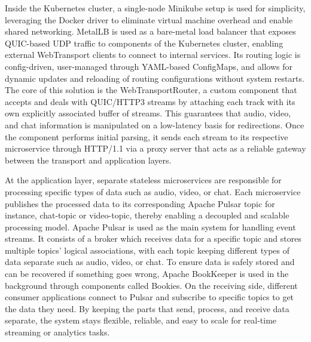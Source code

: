 Inside the Kubernetes cluster, a single-node Minikube setup is used for simplicity, leveraging the Docker driver to eliminate virtual machine overhead and enable shared networking. MetalLB is used as a bare-metal load balancer that exposes QUIC-based UDP traffic to components of the Kubernetes cluster, enabling external WebTransport clients to connect to internal services. Its routing logic is config-driven, user-managed through YAML-based ConfigMaps, and allows for dynamic updates and reloading of routing configurations without system restarts. The core of this solution is the WebTransportRouter, a custom component that accepts and deals with QUIC/HTTP3 streams by attaching each track with its own explicitly associated buffer of streams. This guarantees that audio, video, and chat information is manipulated on a low-latency basis for redirections. Once the component performs initial parsing, it sends each stream to its respective microservice through HTTP/1.1 via a proxy server that acts as a reliable gateway between the transport and application layers.

At the application layer, separate stateless microservices are responsible for processing specific types of data such as audio, video, or chat. Each microservice publishes the processed data to its corresponding Apache Pulsar topic for instance, chat-topic or video-topic, thereby enabling a decoupled and scalable processing model. Apache Pulsar is used as the main system for handling event streams. It consists of a broker which receives data for a specific topic and stores multiple topics' logical associations, with each topic keeping different types of data separate such as audio, video, or chat. To ensure data is safely stored and can be recovered if something goes wrong, Apache BookKeeper is used in the background through components called Bookies. On the receiving side, different consumer applications connect to Pulsar and subscribe to specific topics to get the data they need. By keeping the parts that send, process, and receive data separate, the system stays flexible, reliable, and easy to scale for real-time streaming or analytics tasks.



